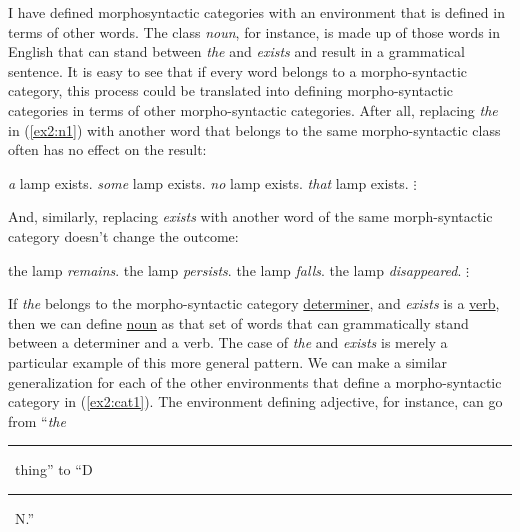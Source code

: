 I have defined morphosyntactic categories with an environment that is defined in terms of other words. The class \emph{noun}, for instance, is made up of those words in English that can stand between \emph{the} and \emph{exists} and result in a grammatical sentence. It is easy to see that if every word belongs to a morpho-syntactic category, this process could be translated into defining morpho-syntactic categories in terms of other morpho-syntactic categories. After all, replacing \emph{the} in (\ref{ex2:n1}) with another word that belongs to the same morpho-syntactic class often has no effect on the result:
\begin{exe}
	\raggedright
	\ex \label{ex2:n11} 
	\begin{xlist}
		\sn \emph{a} lamp exists.
		\sn \emph{some} lamp exists.
		\sn \emph{no} lamp exists.
		\sn \emph{that} lamp exists.
		\sn \hspace*{.5in} $\vdots$
	\end{xlist}
\end{exe}
And, similarly, replacing \emph{exists} with another word of the same morph-syntactic category doesn't change the outcome:
\begin{exe}
	\raggedright
	\ex \label{ex2:n111} 
	\begin{xlist}
		\sn the lamp \emph{remains}.
		\sn the lamp \emph{persists}.
		\sn the lamp \emph{falls}.
		\sn the lamp \emph{disappeared}.
		\sn \hspace*{.5in} $\vdots$
	\end{xlist}
\end{exe}
If \emph{the} belongs to the morpho-syntactic category \underline{determiner}, and \emph{exists} is a \underline{verb}, then we can define \underline{noun} as that set of words that can grammatically stand between a determiner and a verb. The case of \emph{the} and \emph{exists} is merely a particular example of this more general pattern. We can make a similar generalization for each of the other environments that define a morpho-syntactic category in (\ref{ex2:cat1}). The environment defining adjective, for instance, can go from ``\emph{the}~\rule{5mm}{.1mm}~thing'' to ``D~\rule{5mm}{.1mm}~N.''

